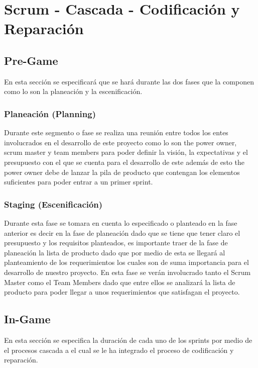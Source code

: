 \section{Scrum - Cascada - Codificación y Reparación}

\subsection{Pre-Game}
En esta sección se  especificará que se hará durante las dos fases que la componen como lo son la planeación y la escenificación.

\subsubsection{Planeación (Planning)}
Durante este segmento o fase se realiza una reunión entre todos los entes involucrados en el desarrollo de este proyecto como lo son the power owner, scrum master y team members  para poder definir la visión, la expectativas y el presupuesto con el que se cuenta para el desarrollo de este además de esto the power owner debe de lanzar la pila de producto que contengan los elementos suficientes para poder entrar a un primer sprint.

\subsubsection{Staging (Escenificación)}
Durante esta fase se tomara en cuenta lo especificado o planteado en la fase anterior es decir en la fase de planeación dado que se tiene que tener claro el presupuesto y los requisitos planteados, es importante traer de la fase de planeación la lista de producto dado que por medio de esta se llegará al planteamiento de los requerimientos los cuales son de suma importancia para el desarrollo de nuestro proyecto. En esta fase se verán involucrado tanto el Scrum Master como el Team Members dado que entre ellos se analizará la lista de producto para poder llegar a unos requerimientos que satisfagan el proyecto.

\subsection{In-Game}
En esta sección se  especifica la duración de cada uno de los sprints por medio de el procesos cascada a el cual se le ha integrado el proceso de codificación y reparación.
